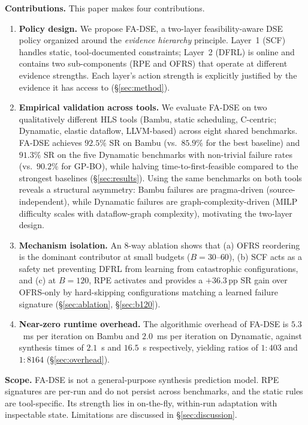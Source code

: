 \documentclass[journal]{IEEEtran}
\begin{document}
\textbf{Contributions.} This paper makes four contributions.
\begin{enumerate}
    \item \textbf{Policy design.} We propose FA-DSE, a two-layer feasibility-aware DSE policy organized around the \emph{evidence hierarchy} principle. Layer~1 (SCF) handles static, tool-documented constraints; Layer~2 (DFRL) is online and contains two sub-components (RPE and OFRS) that operate at different evidence strengths. Each layer's action strength is explicitly justified by the evidence it has access to (\S\ref{sec:method}).
    \item \textbf{Empirical validation across tools.} We evaluate FA-DSE on two qualitatively different HLS tools (Bambu, static scheduling, C-centric; Dynamatic, elastic dataflow, LLVM-based) across eight shared benchmarks. FA-DSE achieves $92.5\%$ SR on Bambu (vs.\ $85.9\%$ for the best baseline) and $91.3\%$ SR on the five Dynamatic benchmarks with non-trivial failure rates (vs.\ $90.2\%$ for GP-BO), while halving time-to-first-feasible compared to the strongest baselines (\S\ref{sec:results}). Using the same benchmarks on both tools reveals a structural asymmetry: Bambu failures are pragma-driven (source-independent), while Dynamatic failures are graph-complexity-driven (MILP difficulty scales with dataflow-graph complexity), motivating the two-layer design.
    \item \textbf{Mechanism isolation.} An 8-way ablation shows that (a) OFRS reordering is the dominant contributor at small budgets ($B{=}30$--$60$), (b) SCF acts as a safety net preventing DFRL from learning from catastrophic configurations, and (c) at $B{=}120$, RPE activates and provides a $+36.3$\,pp SR gain over OFRS-only by hard-skipping configurations matching a learned failure signature (\S\ref{sec:ablation}, \S\ref{sec:b120}).
    \item \textbf{Near-zero runtime overhead.} The algorithmic overhead of FA-DSE is $5.3$~ms per iteration on Bambu and $2.0$~ms per iteration on Dynamatic, against synthesis times of $2.1$~s and $16.5$~s respectively, yielding ratios of $1{:}403$ and $1{:}8164$ (\S\ref{sec:overhead}).
\end{enumerate}

\textbf{Scope.} FA-DSE is not a general-purpose synthesis prediction model. RPE signatures are per-run and do not persist across benchmarks, and the static rules are tool-specific. Its strength lies in on-the-fly, within-run adaptation with inspectable state. Limitations are discussed in \S\ref{sec:discussion}.
\end{document}
